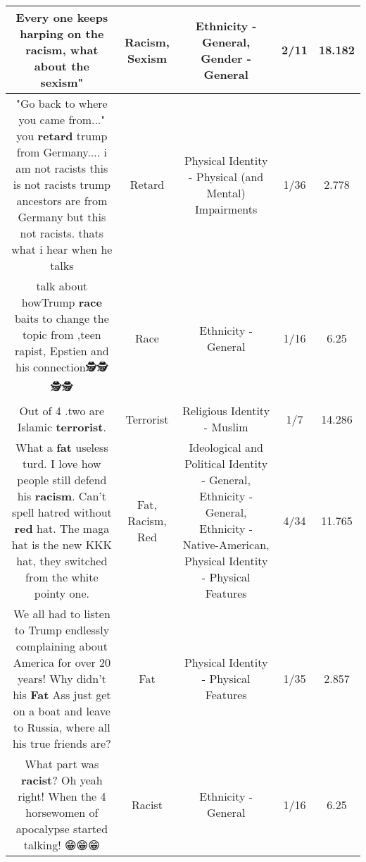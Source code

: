 \documentclass[11pt]{article}
\newlength\mylength
\begin{document}
\begin{center}
\begin{longtable}{|C{.65\mylength}|C{.30\mylength}|C{.12\mylength}|C{.12\mylength}|C{.12\mylength}|}
  \small Every one keeps harping on the \textbf{racism}, what about the \textbf{sexism}"\normalsize   & Racism, Sexism & Ethnicity - General, Gender - General & 2/11 & 18.182 \\  \hline
  \small "Go back to where you came from..." you \textbf{retard} trump from Germany.... i am not racists this is not racists trump ancestors are from Germany  but this not racists. thats what i hear when he talks\normalsize   & Retard & Physical Identity - Physical (and Mental) Impairments & 1/36 & 2.778 \\  \hline
  \small talk about howTrump \textbf{race} baits to change the topic from ,teen rapist, Epstien and his connection🕵️🕵️🕵️🕵️\normalsize   & Race & Ethnicity - General & 1/16 & 6.25 \\  \hline
  \small Out of 4 .two are Islamic \textbf{terrorist}.\normalsize   & Terrorist & Religious Identity - Muslim & 1/7 & 14.286 \\  \hline
  \small What a \textbf{fat} useless turd. I love how people still defend his \textbf{racism}. Can't spell hatred without \textbf{r\textbf{ed}} hat. The maga hat is the new KKK  hat, they switched from the white pointy one.\normalsize   & Fat, Racism, Red &  Ideological and Political Identity - General, Ethnicity - General, Ethnicity - Native-American, Physical Identity - Physical Features & 4/34 & 11.765 \\  \hline
  \small We all had to listen to Trump endlessly complaining about America for over 20 years! Why didn't his \textbf{Fat} Ass just get on a boat and leave to Russia, where all his true friends are?\normalsize   & Fat & Physical Identity - Physical Features & 1/35 & 2.857 \\  \hline
  \small What part was \textbf{racist}? Oh yeah right! When the 4 horsewomen of apocalypse started talking! 😁😁😁\normalsize   & Racist & Ethnicity - General & 1/16 & 6.25 \\  \hline

\end{longtable}
\end{center}
\end{document}
